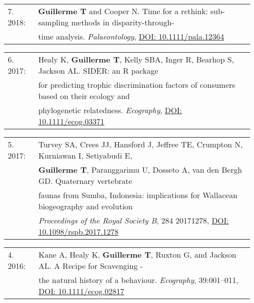 \documentclass[10pt,a4paper]{article}
\begin{document}
{\begin{tabular}{ll}
\end{tabular}

\bigskip

\begin{tabular}{ll}
7. 2018: & \textbf{Guillerme T} and Cooper N. Time for a rethink: sub-sampling methods in disparity-through-\\
      & time analysis. \textit{Palaeontology}, \href{https://onlinelibrary.wiley.com/doi/abs/10.1111/pala.12364}{DOI: 10.1111/pala.12364}\\
\end{tabular}

\bigskip

\begin{tabular}{ll}
6. 2017: & Healy K, \textbf{Guillerme T}, Kelly SBA, Inger R, Bearhop S, Jackson AL. SIDER: an R package\\
      & for predicting trophic discrimination factors of consumers based on their ecology and\\
      & phylogenetic relatedness. \textit{Ecography}, \href{http://onlinelibrary.wiley.com/doi/10.1111/ecog.03371/full}{DOI: 10.1111/ecog.03371}\\
\end{tabular}

\bigskip

\begin{tabular}{ll}
5. 2017: & Turvey SA, Crees JJ, Hansford J, Jeffree TE, Crumpton N, Kurniawan I, Setiyabudi E,\\
      & \textbf{Guillerme T}, Paranggarimu U, Dosseto A, van den Bergh GD. Quaternary vertebrate\\
      & faunas from Sumba, Indonesia: implications for Wallacean biogeography and evolution \\
      & \textit{Proceedings of the Royal Society B}, 284 20171278, \href{http://rspb.royalsocietypublishing.org/content/284/1861/20171278}{DOI: 10.1098/rspb.2017.1278}\\ %
\end{tabular}

\bigskip

\begin{tabular}{ll}
4. 2016: & Kane A, Healy K, \textbf{Guillerme T}, Ruxton G, and Jackson AL. A Recipe for Scavenging -\\
      & the natural history of a behaviour. \textit{Ecography}, 39:001–011, \href{http://onlinelibrary.wiley.com/doi/10.1111/ecog.02817/abstract}{DOI: 10.1111/ecog.02817}\\ %
\end{tabular}

}
\end{document}
